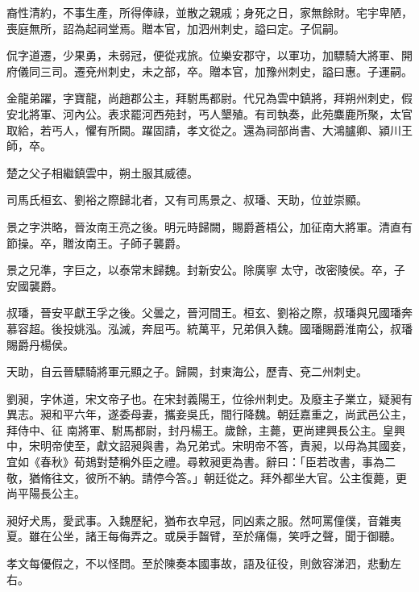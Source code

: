 \begin{pinyinscope}
 裔性清約，不事生產，所得俸祿，並散之親戚；身死之日，家無餘財。宅宇卑陋，喪庭無所，詔為起祠堂焉。贈本官，加泗州刺史，謚曰定。子侃嗣。



 侃字道遷，少果勇，未弱冠，便從戎旅。位樂安郡守，以軍功，加驃騎大將軍、開府儀同三司。遷兗州刺史，未之部，卒。贈本官，加豫州刺史，謚曰惠。子運嗣。



 金龍弟躍，字寶龍，尚趙郡公主，拜駙馬都尉。代兄為雲中鎮將，拜朔州刺史，假安北將軍、河內公。表求罷河西苑封，丐人墾殖。有司執奏，此苑麋鹿所聚，太官取給，若丐人，懼有所闕。躍固請，孝文從之。還為祠部尚書、大鴻臚卿、潁川王師，卒。



 楚之父子相繼鎮雲中，朔土服其威德。



 司馬氏桓玄、劉裕之際歸北者，又有司馬景之、叔璠、天助，位並崇顯。



 景之字洪略，晉汝南王亮之後。明元時歸闕，賜爵蒼梧公，加征南大將軍。清直有節操。卒，贈汝南王。子師子襲爵。



 景之兄準，字巨之，以泰常末歸魏。封新安公。除廣寧
 太守，改密陵侯。卒，子安國襲爵。



 叔璠，晉安平獻王孚之後。父曇之，晉河間王。桓玄、劉裕之際，叔璠與兄國璠奔慕容超。後投姚泓。泓滅，奔屈丐。統萬平，兄弟俱入魏。國璠賜爵淮南公，叔璠賜爵丹楊侯。



 天助，自云晉驃騎將軍元顯之子。歸闕，封東海公，歷青、兗二州刺史。



 劉昶，字休道，宋文帝子也。在宋封義陽王，位徐州刺史。及廢主子業立，疑昶有異志。昶和平六年，遂委母妻，攜妾吳氏，間行降魏。朝廷嘉重之，尚武邑公主，拜侍中、征
 南將軍、駙馬都尉，封丹楊王。歲餘，主薨，更尚建興長公主。皇興中，宋明帝使至，獻文詔昶與書，為兄弟式。宋明帝不答，責昶，以母為其國妾，宜如《春秋》荀鳷對楚稱外臣之禮。尋敕昶更為書。辭曰：「臣若改書，事為二敬，猶脩往文，彼所不納。請停今答。」朝廷從之。拜外都坐大官。公主復薨，更尚平陽長公主。



 昶好犬馬，愛武事。入魏歷紀，猶布衣皁冠，同凶素之服。然呵罵僮僕，音雜夷夏。雖在公坐，諸王每侮弄之。或戾手齧臂，至於痛傷，笑呼之聲，聞于御聽。



 孝文每優假之，不以怪問。至於陳奏本國事故，語及征役，則斂容涕泗，悲動左右。




\end{pinyinscope}

